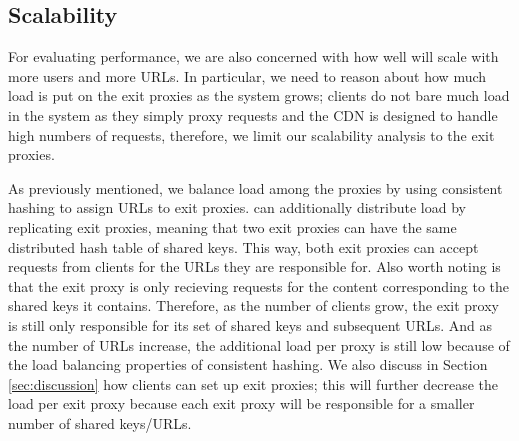 
\subsection{Scalability}
For evaluating performance, we are also concerned with how well \system{} will scale with more users 
and more URLs.  In particular, we need to reason about how much load is put on the exit proxies as the 
system grows; clients do not bare much load in the system as they simply proxy requests and the CDN is designed 
to handle high numbers of requests, therefore, we limit our scalability analysis to the exit proxies.  

As previously mentioned, we balance load among the proxies by using consistent hashing to assign URLs to 
exit proxies.  \system{} can additionally distribute load by replicating exit proxies, meaning that two exit proxies can 
have the same distributed hash table of shared keys.  This way, both exit proxies can accept requests from clients for 
the URLs they are responsible for.  Also worth noting is that the exit proxy is only recieving requests for the content 
corresponding to the shared keys it contains.  Therefore, as the number of clients grow, the exit proxy is still only responsible 
for its set of shared keys and subsequent URLs.  And as the number of URLs increase, the additional load per proxy is 
still low because of the load balancing properties of consistent hashing.  We also discuss in Section \ref{sec:discussion} how 
clients can set up exit proxies; this will further decrease the load per exit proxy because each exit proxy will be responsible 
for a smaller number of shared keys/URLs.